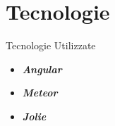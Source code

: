 \section{Tecnologie}

\begin{frame}{Tecnologie Utilizzate}
	\begin{itemize}
		\item \textbf{\textit{Angular}}
		\item \textbf{\textit{Meteor}}
		\item \textbf{\textit{Jolie}}
	\end{itemize}
\end{frame}

